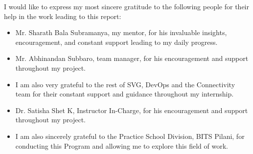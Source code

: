 \documentclass[11pt, a4paper, oneside]{Thesis} %
\title{\ttitle} %
\begin{document}
\frontmatter %


\fancyhead{} %
\rhead{\thepage} %
\lhead{} %

\pagestyle{fancy} %


\makeatletter
\newcommand*\@lbracket{[}
\newcommand*\@rbracket{]}
\newcommand*\@colon{:}
\newcommand*\colorIndex{%
    \edef\@temp{\the\lst@token}%
    \ifx\@temp\@lbracket \color{black}%
    \else\ifx\@temp\@rbracket \color{black}%
        \else\ifx\@temp\@colon \color{black}%
            \else \color{vorange}%
            \fi\fi\fi
}
\makeatother
\maketitle
\titleP
{} %
 
\AbstractSheet

\begin{acknowledgements}
    I would like to express my most sincere gratitude to the following people for their help in the work leading to this report:
    \begin{itemize}
        \item Mr. Sharath Bala Subramanya, my mentor, for his invaluable insights, encouragement, and constant support leading to my daily progress.
        \item Mr. Abhinandan Subbaro, team manager, for his encouragement and support throughout my project.
        \item I am also very grateful to the rest of SVG, DevOps and the Connectivity team for their constant support and guidance throughout my internship.
        \item Dr. Satisha Shet K, Instructor In-Charge, for his encouragement and support throughout my project.
        \item I am also sincerely grateful to the Practice School Division, BITS Pilani, for conducting this Program and allowing me to explore this field of work.
    \end{itemize}

\end{acknowledgements}
\end{document}

